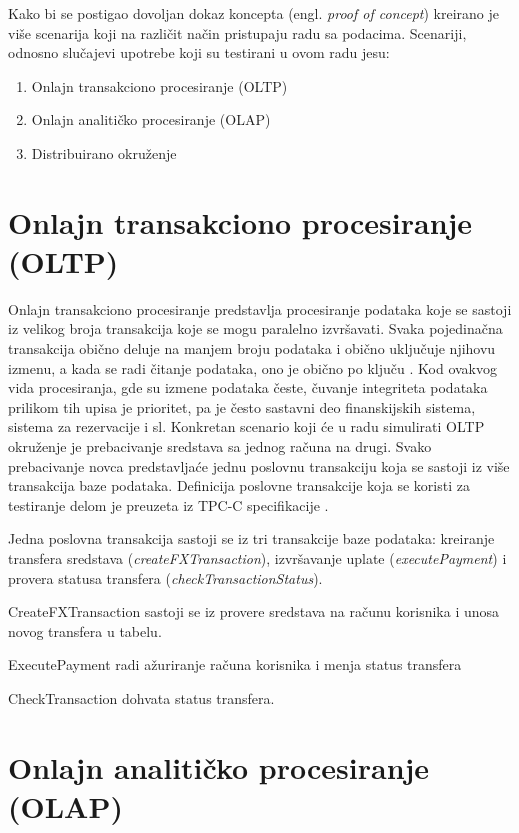 \documentclass[12pt,oneside]{memoir}
\begin{document}
Kako bi se postigao dovoljan dokaz koncepta (engl. \textit{proof of concept}) kreirano je više scenarija koji na različit način pristupaju radu sa podacima. Scenariji, odnosno slučajevi upotrebe koji su testirani u ovom radu jesu: 
\begin{enumerate}
\item Onlajn transakciono procesiranje (OLTP)
\item Onlajn analitičko procesiranje (OLAP)
\item Distribuirano okruženje
\end{enumerate}


\section{Onlajn transakciono procesiranje (OLTP)}
Onlajn transakciono procesiranje predstavlja procesiranje podataka koje se sastoji iz velikog broja transakcija koje se mogu paralelno izvršavati.  Svaka pojedinačna transakcija obično deluje na manjem broju podataka i obično uključuje njihovu izmenu, a kada se radi čitanje podataka, ono je obično po ključu \cite{oltp}. Kod ovakvog vida procesiranja, gde su izmene podataka česte, čuvanje integriteta podataka prilikom tih upisa je prioritet, pa je često sastavni deo finanskijskih sistema, sistema za rezervacije i sl.
Konkretan scenario koji će u radu simulirati OLTP okruženje je prebacivanje sredstava sa jednog računa na drugi. Svako prebacivanje novca predstavljaće jednu poslovnu transakciju koja se sastoji iz više transakcija baze podataka. Definicija poslovne transakcije koja se koristi za testiranje delom je preuzeta iz TPC-C specifikacije \cite{tpcc}. 

Jedna poslovna transakcija sastoji se iz tri transakcije baze podataka: kreiranje transfera sredstava (\textit{createFXTransaction}), izvršavanje uplate (\textit{executePayment}) i provera statusa transfera (\textit{checkTransactionStatus}).

CreateFXTransaction sastoji se iz provere sredstava na računu korisnika i unosa novog transfera u tabelu.

ExecutePayment radi ažuriranje računa korisnika i menja status transfera

CheckTransaction dohvata status transfera.

\section{Onlajn analitičko procesiranje (OLAP)}
\end{document}
